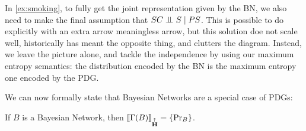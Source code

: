 \documentclass{article}
\newcommand\MaxEnt{{\overset{\uparrow}{\mathbf H}}}
\newcommand{\MN}{PDG}
\newcommand{\MNs}{\MN s}
\begin{document}
%		
	
	
	
	
	


	
	In \cref{ex:smoking}, to fully get the joint representation given by the BN, we also need to make the final assumption that $SC \mathrel{\perp\mspace{-10mu}\perp} S \mid PS$. This is possible to do explicitly with an extra arrow meaningless arrow, but this solution doe not scale well, historically has meant the opposite thing, and clutters the diagram. Instead, we leave the picture alone, and tackle the independence by using our maximum entropy semantics: the distribution encoded by the BN is the maximum entropy one encoded by the \MN.

	We can now formally state that Bayesian Networks are a special case of \MNs: 
	\begin{theorem}
		If $B$ is a Bayesian Network, then $\bbr{\Gamma(B)}_\MaxEnt =\{\Pr_B\}$.
	\end{theorem}
\end{document}
